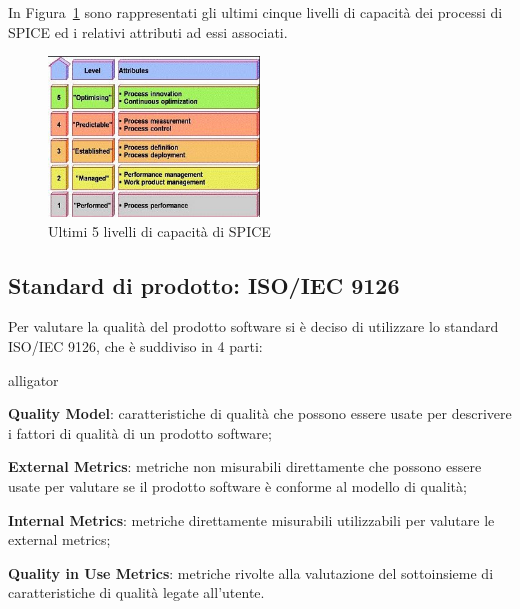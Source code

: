 In Figura~\ref{fig:liv_cap_spice} sono rappresentati gli ultimi cinque livelli di capacità dei processi di SPICE ed i relativi attributi ad essi associati.

\begin{figure}[h!]
	\centering
	\includegraphics[width=0.50\textwidth]{img/liv_cap_spice.jpg}
	\caption{Ultimi 5 livelli di capacità di SPICE}
	\label{fig:liv_cap_spice}
\end{figure}


\subsection{Standard di prodotto: ISO/IEC 9126}
\label{AppA:standardProd}
Per valutare la qualità del prodotto software si è deciso di utilizzare lo standard ISO/IEC 9126, che è suddiviso in 4 parti:
\begin{labeling}{alligator}
	\item \textbf{Quality Model}: caratteristiche di qualità che possono essere usate per descrivere i fattori di qualità di un prodotto software;
	
	\item \textbf{External Metrics}: metriche non misurabili direttamente che possono essere usate per valutare se il prodotto software è conforme al modello di qualità;
	
	\item \textbf{Internal Metrics}: metriche direttamente misurabili utilizzabili per valutare le external metrics;
	
	\item \textbf{Quality in Use Metrics}: metriche rivolte alla valutazione del sottoinsieme di caratteristiche di qualità legate all’utente.
\end{labeling}


